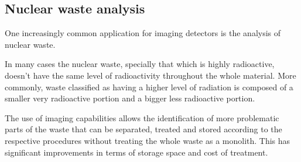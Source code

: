 \subsection{Nuclear waste analysis}

One increasingly common application for imaging detectors is the analysis of nuclear waste.

In many cases the nuclear waste, specially that which is highly radioactive, doesn't have the same level of radioactivity throughout the whole material. More commonly, waste classified as having a higher level of radiation is composed of a smaller very radioactive portion and a bigger less radioactive portion. 

The use of imaging capabilities allows the identification of more problematic parts of the waste that can be separated, treated and stored according to the respective procedures without treating the whole waste as a monolith. This has significant improvements in terms of storage space and cost of treatment.


